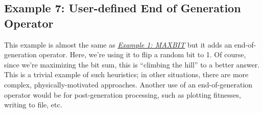 \documentclass[letterpaper,11pt,english]{sphinxmanual}
\begin{document}
\subsection{Example 7: User-defined End of Generation Operator}
\label{examples:example-7-user-defined-end-of-generation-operator}\label{examples:sec-endofgenexamples}
This example is almost the same as {\hyperref[examples:sec-maxbitexample]{\emph{Example 1: MAXBIT}}} but it
adds an end-of-generation operator.  Here, we're using it to
flip a random bit to 1.  Of course, since we're maximizing the
bit sum, this is ``climbing the hill'' to a better answer.  This is
a trivial example of such heuristics; in other situations, there are
more complex, physically-motivated approaches.  Another use of an
end-of-generation operator would be for post-generation processing,
such as plotting fitnesses, writing to file, etc.
\end{document}
